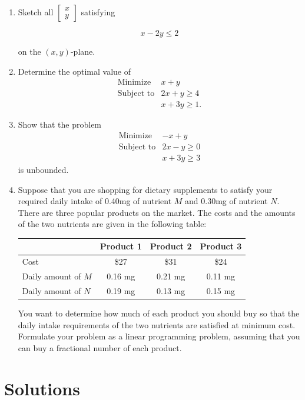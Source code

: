 \documentclass[]{book}
\theoremstyle{definition}
\theoremstyle{definition}
\theoremstyle{remark}
\begin{document}
\begin{enumerate}
\def\labelenumi{\arabic{enumi}.}
\item
  Sketch all \(\begin{bmatrix} x \\ y \end{bmatrix}\) satisfying

  \begin{equation*}
  x - 2y \leq 2
  \end{equation*}

  on the \((x,y)\)-plane.
\item
  Determine the optimal value of \[
  \begin{array}{rl}
  \text{Minimize} & x + y \\
  \text{Subject to} &  2x + y \geq 4 \\
  & x + 3y \geq 1.
  \end{array}
  \]
\item
  Show that the problem \[
  \begin{array}{rl}
  \text{Minimize} & -x + y \\
  \text{Subject to} &  2x - y \geq 0 \\
  & x + 3y \geq 3
  \end{array}
  \] is unbounded.
\item
  Suppose that you are shopping for dietary supplements to satisfy your
  required daily intake of 0.40mg of nutrient \(M\) and 0.30mg of
  nutrient \(N\). There are three popular products on the market. The
  costs and the amounts of the two nutrients are given in the following
  table:

  \begin{longtable}[]{@{}lccc@{}}
  \toprule
  & Product 1 & Product 2 & Product 3\tabularnewline
  \midrule
  \endhead
  Cost & \$27 & \$31 & \$24\tabularnewline
  Daily amount of \(M\) & 0.16 mg & 0.21 mg & 0.11 mg\tabularnewline
  Daily amount of \(N\) & 0.19 mg & 0.13 mg & 0.15 mg\tabularnewline
  \bottomrule
  \end{longtable}

  You want to determine how much of each product you should buy so that
  the daily intake requirements of the two nutrients are satisfied at
  minimum cost. Formulate your problem as a linear programming problem,
  assuming that you can buy a fractional number of each product.
\end{enumerate}

\section*{Solutions}\label{solutions}
\end{document}
